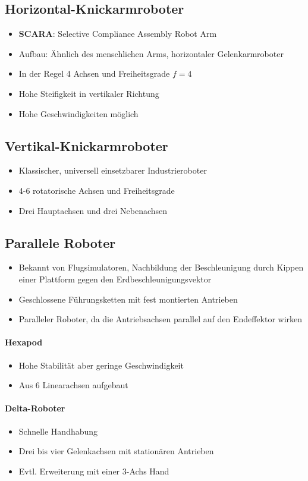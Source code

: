 \subsection{Horizontal-Knickarmroboter}
\begin{itemize}
	\item \textbf{SCARA}: Selective Compliance Assembly Robot Arm
	\item Aufbau: Ähnlich des menschlichen Arms, horizontaler Gelenkarmroboter
	\item In der Regel 4 Achsen und Freiheitsgrade $f = 4$
	\item Hohe Steifigkeit in vertikaler Richtung
	\item Hohe Geschwindigkeiten möglich
\end{itemize}
\subsection{Vertikal-Knickarmroboter}
\begin{itemize}
	\item Klassischer, universell einsetzbarer Industrieroboter
	\item 4-6 rotatorische Achsen und Freiheitsgrade
	\item Drei Hauptachsen und drei Nebenachsen
\end{itemize}
\subsection{Parallele Roboter}
\begin{itemize}
	\item Bekannt von Flugsimulatoren, Nachbildung der Beschleunigung durch Kippen einer Plattform gegen den Erdbeschleunigungsvektor
	\item Geschlossene Führungsketten mit fest montierten Antrieben
	\item Paralleler Roboter, da die Antriebsachsen parallel auf den Endeffektor wirken
\end{itemize}
\paragraph{Hexapod}
\begin{itemize}
	\item Hohe Stabilität aber geringe Geschwindigkeit
	\item Aus 6 Linearachsen aufgebaut
\end{itemize}
\paragraph{Delta-Roboter}
\begin{itemize}
	\item Schnelle Handhabung
	\item Drei bis vier Gelenkachsen mit stationären Antrieben
	\item Evtl. Erweiterung mit einer 3-Achs Hand
\end{itemize}
